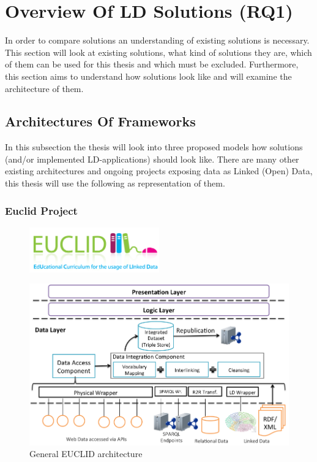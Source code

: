 \chapter{Overview Of LD Solutions (RQ1)}\label{overview}
In order to compare solutions an understanding of existing solutions is necessary. This section will look at existing solutions, what kind of solutions they are, which of them can be used for this thesis and which must be excluded. Furthermore, this section aims to understand how solutions look like and will examine the architecture of them.

\section{Architectures Of Frameworks}\label{arch_frameworks}
In this subsection the thesis will look into three proposed models how solutions (and/or implemented LD-applications) should look like. There are many other existing architectures and ongoing projects exposing data as Linked (Open) Data, this thesis will use the following as representation of them.

\subsection{Euclid Project}

\begin{figure}[h]
	\centering
\includegraphics[width=0.5\textwidth]{img/euclid_logo.png}
\end{figure}

\begin{figure}[htbp]
	\centering
\includegraphics[width=.8\textwidth]{img/euclid_architecture.png}
	\caption{General EUCLID architecture}
	\label{euclid_architecture}
\end{figure}

